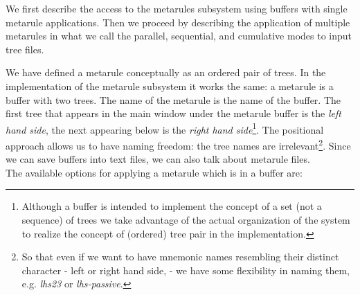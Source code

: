 We first describe the access to the metarules subsystem using buffers with 
single metarule applications. Then we proceed by describing the application of 
multiple metarules in what we call the parallel, sequential, and cumulative 
modes to input tree files. 
 
We have defined a metarule conceptually as an ordered pair of trees.  In the 
implementation of the metarule subsystem it works the same: a metarule is a 
buffer with two trees. The name of the metarule is the name of the buffer. The 
first tree that appears in the main window under the metarule buffer is the 
{\it left hand side}, the next appearing below is the {\it right hand side}\footnote{Although a buffer is intended to implement the concept of a set (not a sequence) of trees we take advantage of the actual organization of the system to realize the concept of (ordered) tree pair in the implementation.}. 
The positional approach allows us to have naming freedom: the tree names are 
irrelevant\footnote{So that even if we want to have mnemonic names resembling their distinct character - left or right hand side, - we have some flexibility in naming them, e.g. {\it lhs23} or {\it lhs-passive}.}.  Since we can save 
buffers into text files, we can also talk about metarule files. \\ 
 
The available options for applying a metarule which is in a buffer are: 
 
